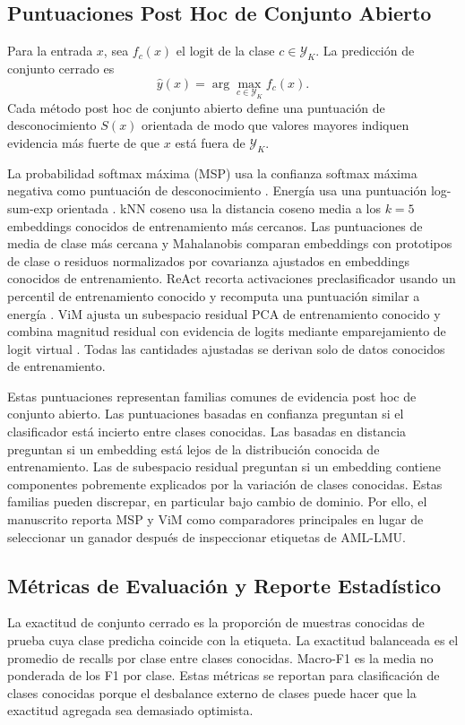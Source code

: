\documentclass[11pt]{article}
\begin{document}
\subsection{Puntuaciones Post Hoc de Conjunto Abierto}

Para la entrada $x$, sea $f_c(x)$ el logit de la clase $c\in\mathcal{Y}_K$. La predicción de conjunto cerrado es
\[
\hat{y}(x)=\arg\max_{c\in\mathcal{Y}_K} f_c(x).
\]
Cada método post hoc de conjunto abierto define una puntuación de desconocimiento $S(x)$ orientada de modo que valores mayores indiquen evidencia más fuerte de que $x$ está fuera de $\mathcal{Y}_K$.

La probabilidad softmax máxima (MSP) usa la confianza softmax máxima negativa como puntuación de desconocimiento \cite{hendrycks2017_msp}. Energía usa una puntuación log-sum-exp orientada \cite{liu2020_energy}. kNN coseno usa la distancia coseno media a los $k=5$ embeddings conocidos de entrenamiento más cercanos. Las puntuaciones de media de clase más cercana y Mahalanobis comparan embeddings con prototipos de clase o residuos normalizados por covarianza ajustados en embeddings conocidos de entrenamiento. ReAct recorta activaciones preclasificador usando un percentil de entrenamiento conocido y recomputa una puntuación similar a energía \cite{sun2021_react}. ViM ajusta un subespacio residual PCA de entrenamiento conocido y combina magnitud residual con evidencia de logits mediante emparejamiento de logit virtual \cite{wang2022_vim}. Todas las cantidades ajustadas se derivan solo de datos conocidos de entrenamiento.

Estas puntuaciones representan familias comunes de evidencia post hoc de conjunto abierto. Las puntuaciones basadas en confianza preguntan si el clasificador está incierto entre clases conocidas. Las basadas en distancia preguntan si un embedding está lejos de la distribución conocida de entrenamiento. Las de subespacio residual preguntan si un embedding contiene componentes pobremente explicados por la variación de clases conocidas. Estas familias pueden discrepar, en particular bajo cambio de dominio. Por ello, el manuscrito reporta MSP y ViM como comparadores principales en lugar de seleccionar un ganador después de inspeccionar etiquetas de AML-LMU.

\subsection{Métricas de Evaluación y Reporte Estadístico}

La exactitud de conjunto cerrado es la proporción de muestras conocidas de prueba cuya clase predicha coincide con la etiqueta. La exactitud balanceada es el promedio de recalls por clase entre clases conocidas. Macro-F1 es la media no ponderada de los F1 por clase. Estas métricas se reportan para clasificación de clases conocidas porque el desbalance externo de clases puede hacer que la exactitud agregada sea demasiado optimista.
\end{document}
